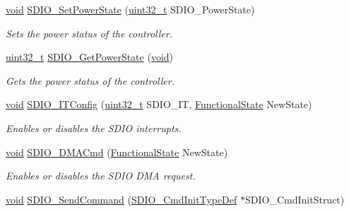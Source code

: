 \begin{DoxyCompactItemize}
\hyperlink{usb__devapi_8h_afabf60e7f57651d6d595a02c75f07cd0}{void} \hyperlink{group___s_d_i_o___private___functions_ga36ecca32b904de74218fbe65cd5f5270}{S\+D\+I\+O\+\_\+\+Set\+Power\+State} (\hyperlink{_p_e___types_8h_a33594304e786b158f3fb30289278f5af}{uint32\+\_\+t} S\+D\+I\+O\+\_\+\+Power\+State)
\begin{DoxyCompactList}\small\item\em Sets the power status of the controller. \end{DoxyCompactList}\item 
\hyperlink{_p_e___types_8h_a33594304e786b158f3fb30289278f5af}{uint32\+\_\+t} \hyperlink{group___s_d_i_o___private___functions_ga3a19de2c7cd51645702213f64a1758ed}{S\+D\+I\+O\+\_\+\+Get\+Power\+State} (\hyperlink{usb__devapi_8h_afabf60e7f57651d6d595a02c75f07cd0}{void})
\begin{DoxyCompactList}\small\item\em Gets the power status of the controller. \end{DoxyCompactList}\item 
\hyperlink{usb__devapi_8h_afabf60e7f57651d6d595a02c75f07cd0}{void} \hyperlink{group___s_d_i_o___private___functions_ga208f51237ef43288735829dbaed37f00}{S\+D\+I\+O\+\_\+\+I\+T\+Config} (\hyperlink{_p_e___types_8h_a33594304e786b158f3fb30289278f5af}{uint32\+\_\+t} S\+D\+I\+O\+\_\+\+IT, \hyperlink{agilefox_2library_2inc_2stm32f10x__type_8h_ac9a7e9a35d2513ec15c3b537aaa4fba1}{Functional\+State} New\+State)
\begin{DoxyCompactList}\small\item\em Enables or disables the S\+D\+IO interrupts. \end{DoxyCompactList}\item 
\hyperlink{usb__devapi_8h_afabf60e7f57651d6d595a02c75f07cd0}{void} \hyperlink{group___s_d_i_o___private___functions_gad36fde5ec0ce0c2089b9d971c2271e6e}{S\+D\+I\+O\+\_\+\+D\+M\+A\+Cmd} (\hyperlink{agilefox_2library_2inc_2stm32f10x__type_8h_ac9a7e9a35d2513ec15c3b537aaa4fba1}{Functional\+State} New\+State)
\begin{DoxyCompactList}\small\item\em Enables or disables the S\+D\+IO D\+MA request. \end{DoxyCompactList}\item 
\hyperlink{usb__devapi_8h_afabf60e7f57651d6d595a02c75f07cd0}{void} \hyperlink{group___s_d_i_o___private___functions_ga7117d2f702703f6c0a66bc07707cab23}{S\+D\+I\+O\+\_\+\+Send\+Command} (\hyperlink{struct_s_d_i_o___cmd_init_type_def}{S\+D\+I\+O\+\_\+\+Cmd\+Init\+Type\+Def} $\ast$S\+D\+I\+O\+\_\+\+Cmd\+Init\+Struct)

\end{DoxyCompactItemize}
